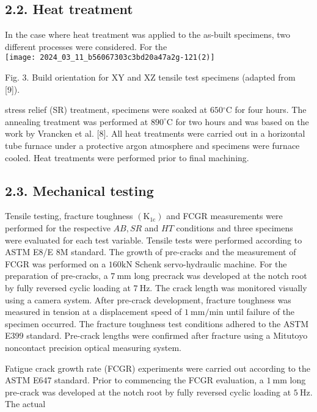 \documentclass[10pt]{article}
\begin{document}
\subsection*{2.2. Heat treatment}
In the case where heat treatment was applied to the as-built specimens, two different processes were considered. For the\\
\texttt{[image: 2024\_03\_11\_b56067303c3bd20a47a2g-121(2)]}

Fig. 3. Build orientation for $\mathrm{XY}$ and $\mathrm{XZ}$ tensile test specimens (adapted from [9]).

stress relief (SR) treatment, specimens were soaked at $650{ }^{\circ} \mathrm{C}$ for four hours. The annealing treatment was performed at $890^{\circ} \mathrm{C}$ for two hours and was based on the work by Vrancken et al. [8]. All heat treatments were carried out in a horizontal tube furnace under a protective argon atmosphere and specimens were furnace cooled. Heat treatments were performed prior to final machining.

\subsection*{2.3. Mechanical testing}
Tensile testing, fracture toughness $\left(\mathrm{K}_{1 \mathrm{c}}\right)$ and FCGR measurements were performed for the respective $A B, S R$ and $H T$ conditions and three specimens were evaluated for each test variable. Tensile tests were performed according to ASTM E8/E $8 \mathrm{M}$ standard. The growth of pre-cracks and the measurement of FCGR was performed on a $160 \mathrm{kN}$ Schenk servo-hydraulic machine. For the preparation of pre-cracks, a $7 \mathrm{~mm}$ long precrack was developed at the notch root by fully reversed cyclic loading at $7 \mathrm{~Hz}$. The crack length was monitored visually using a camera system. After pre-crack development, fracture toughness was measured in tension at a displacement speed of $1 \mathrm{~mm} / \mathrm{min}$ until failure of the specimen occurred. The fracture toughness test conditions adhered to the ASTM E399 standard. Pre-crack lengths were confirmed after fracture using a Mitutoyo noncontact precision optical measuring system.

Fatigue crack growth rate (FCGR) experiments were carried out according to the ASTM E647 standard. Prior to commencing the FCGR evaluation, a $1 \mathrm{~mm}$ long pre-crack was developed at the notch root by fully reversed cyclic loading at $5 \mathrm{~Hz}$. The actual
\end{document}
